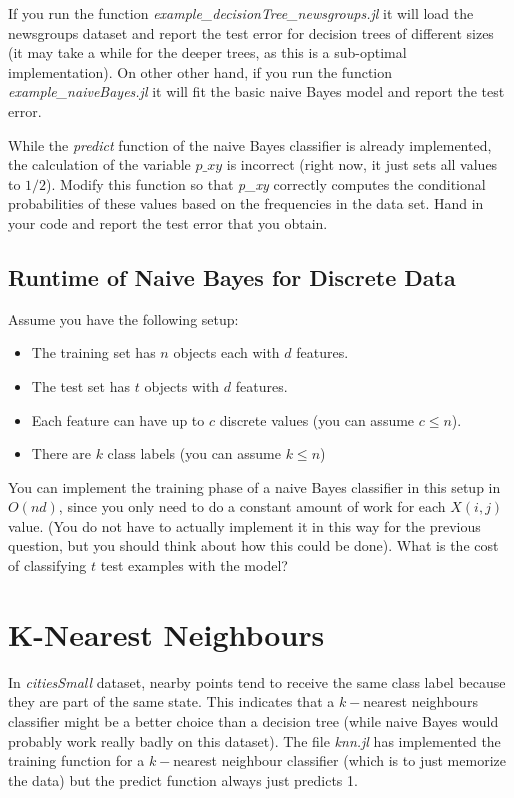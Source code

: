 \documentclass{article}
\def\blu#1{{\color{blu}#1}}
\def\items#1{\begin{itemize}#1\end{itemize}}
\begin{document}
If you run the function \emph{example\_decisionTree\_newsgroups.jl} it will load the newsgroups dataset and report the test error for decision trees of different sizes (it may take a while for the deeper trees, as this is a sub-optimal implementation). On other other hand, if you run the function \emph{example\_naiveBayes.jl} it will fit the basic naive Bayes model and report the test error.

While the \emph{predict} function of the naive Bayes classifier is already implemented, the calculation of the variable $p\_xy$ is incorrect (right now, it just sets all values to $1/2$). \blu{Modify this function so that \emph{p\_xy} correctly computes the conditional probabilities of these values based on the frequencies in the data set. Hand in your code and report the test error that you obtain.}


\subsection{Runtime of Naive Bayes for Discrete Data}

Assume you have the following setup:
\items{
\item The training set has $n$ objects each with $d$ features.
\item The test set has $t$ objects with $d$ features.
\item Each feature can have up to $c$ discrete values (you can assume $c \leq n$).
\item There are $k$ class labels (you can assume $k \leq n$)
}
You can implement the training phase of a naive Bayes classifier in this setup in $O(nd)$, since you only need to do a constant amount of work for each $X(i,j)$ value. (You do not have to actually implement it in this way for the previous question, but you should think about how this could be done). \blu{What is the cost of classifying $t$ test examples with the model?}




\section{K-Nearest Neighbours}


In \emph{citiesSmall} dataset, nearby points tend to receive the same class label because they are part of the same state. This indicates that a $k-$nearest neighbours classifier might be a better choice than a decision tree (while naive Bayes would probably work really badly on this dataset). The file \emph{knn.jl} has implemented the training function for a $k-$nearest neighbour classifier (which is to just memorize the data) but the predict function always just predicts 1.
\end{document}
